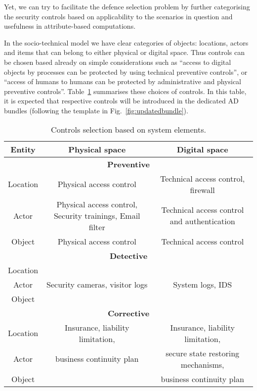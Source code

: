 \documentclass{llncs}
\begin{document}
Yet, we can try to facilitate the defence selection problem by further categorising the security controls based on applicability to the scenarios in question and usefulness in attribute-based computations. 

In the socio-technical model we have clear categories of objects: locations, actors and items that can belong to either physical or digital space. Thus controls can be chosen based already on simple considerations such as ``access to digital objects by processes can be protected by using technical preventive controls'', or ``access of humans to humans can be protected by administrative and physical preventive controls''. Table~\ref{tab:preventive} summarises these choices of controls. In this table, it is expected that respective controls will be introduced in the dedicated AD bundles (following the template in Fig.~\ref{fig:updatedbundle}).


\begin{table}[t!]
\centering
\caption{Controls selection based on system elements. }
\label{tab:preventive}
\scriptsize
\begin{tabular}{|c|c|c|}
\hline
\textbf{Entity}  &  \textbf{Physical space}  & \textbf{Digital space}   \\
\hline
\hline
\multicolumn{3}{|c|}{\textbf{Preventive}}\\
\hline
Location & Physical access control  & Technical access control, firewall  \\
\hline
Actor & Physical access control, Security trainings, Email filter  & Technical access control and authentication\\
\hline
Object & Physical access control  & Technical access control \\
\hline
\multicolumn{3}{|c|}{\textbf{Detective}}\\
\hline
Location & \multirow{3}{*}{ Security cameras, visitor logs}  & \multirow{3}{*}{System logs, IDS} \\
Actor & &\\
Object & & \\

\hline
\multicolumn{3}{|c|}{\textbf{Corrective}}\\
\hline
Location & 
Insurance, liability limitation,   & Insurance, liability limitation, \\
Actor &  business continuity plan & secure state restoring mechanisms, \\
Object &   & business continuity plan \\
\hline

\end{tabular}
\end{table}
\end{document}

